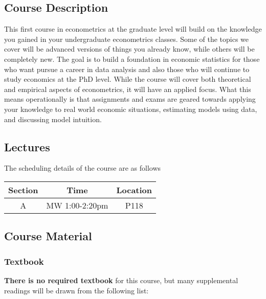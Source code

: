 \documentclass[
  letterpaper,
  DIV=11,
  numbers=noendperiod]{scrartcl}
\begin{document}
\hypertarget{course-description}{%
\subsection{Course Description}\label{course-description}}

This first course in econometrics at the graduate level will build on
the knowledge you gained in your undergraduate econometrics classes.
Some of the topics we cover will be advanced versions of things you
already know, while others will be completely new. The goal is to build
a foundation in economic statistics for those who want pursue a career
in data analysis and also those who will continue to study economics at
the PhD level. While the course will cover both theoretical and
empirical aspects of econometrics, it will have an applied focus. What
this means operationally is that assignments and exams are geared
towards applying your knowledge to real world economic situations,
estimating models using data, and discussing model intuition.

\hypertarget{lectures}{%
\subsection{Lectures}\label{lectures}}

The scheduling details of the course are as follows

\begin{longtable}[]{@{}ccc@{}}
\toprule\noalign{}
Section & Time & Location \\
\midrule\noalign{}
\endhead
\bottomrule\noalign{}
\endlastfoot
A & MW 1:00-2:20pm & P118 \\
\end{longtable}

\hypertarget{course-material}{%
\subsection{Course Material}\label{course-material}}

\hypertarget{textbook}{%
\subsubsection{Textbook}\label{textbook}}

\textbf{There is no required textbook} for this course, but many
supplemental readings will be drawn from the following list:
\end{document}
